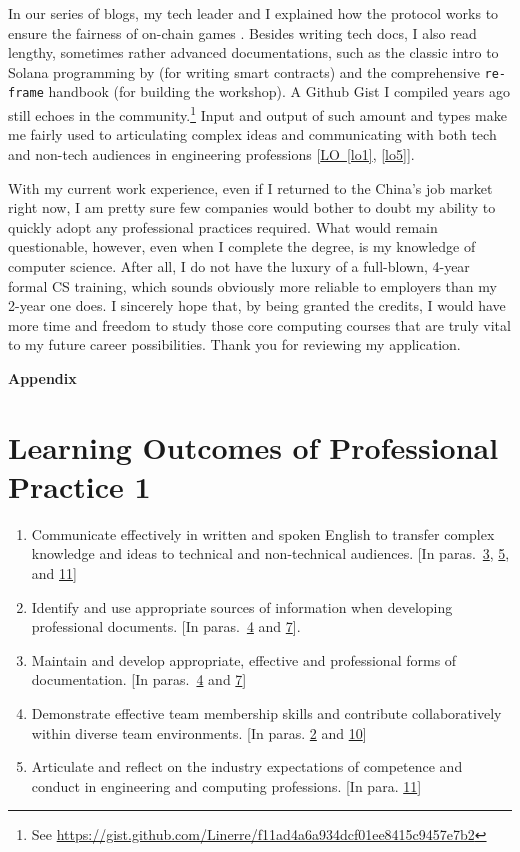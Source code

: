 \documentclass[12pt,a4paper]{article}
\renewcommand{\appendixpagename}{\centerline{{\Large\bfseries Appendix}}}
\newcommand{\refpp}[1]{\hyperref[#1]{LO~\ref{#1}}}
\newcommand{\refpa}[1]{\hyperlink{para#1}{#1}}
\begin{document}
\hypertarget{para11}{}
In our series of blogs, my tech leader and I explained how the protocol works to ensure the fairness of on-chain games \citep{race2022}.  Besides writing tech docs,  I also read lengthy, sometimes rather advanced documentations, such as the classic intro to Solana programming by \citet*{paulx2021} (for writing smart contracts) and the comprehensive \texttt{re-frame} handbook \citep{day8} (for building the workshop).  A Github Gist I compiled years ago still echoes in the community.\footnote{See \url{https://gist.github.com/Linerre/f11ad4a6a934dcf01ee8415c9457e7b2}}  Input and output of such amount and types make me fairly used to articulating complex ideas  and communicating with both tech and non-tech audiences in engineering professions [\refpp{lo1}, \ref{lo5}].

With my current work experience, even if I returned to the China's job market right now, I am pretty sure few companies would bother to doubt my ability to quickly adopt any professional practices required.  What would remain questionable, however, even when I complete the degree, is my knowledge of computer science.  After all, I do not have the luxury of a full-blown, 4-year formal CS training, which sounds obviously more reliable to employers than my 2-year one does.  I sincerely hope that, by being granted the credits, I would have more time and freedom to study those core computing courses that are truly vital to my future career possibilities.  Thank you for reviewing my application.




\clearpage
\appendixpagename
\setcounter{section}{0}%
\renewcommand{\thesection}{\Alph{section}}%
\section*{Learning Outcomes of Professional Practice 1}
\begin{enumerate}
\item\label{lo1} Communicate effectively in written and spoken English to transfer complex knowledge and ideas to technical and non-technical audiences. [In paras.~\refpa{3}, \refpa{5}, and \refpa{11}]
\item\label{lo2} Identify and use appropriate sources of information when developing professional documents.  [In paras.~\refpa{4} and \refpa{7}].
\item\label{lo3} Maintain and develop appropriate, effective and professional forms of documentation.  [In paras.~\refpa{4} and \refpa{7}]
\item\label{lo4} Demonstrate effective team membership skills and contribute collaboratively within diverse team environments.  [In paras. \refpa{2} and \refpa{10}]
\item\label{lo5} Articulate and reflect on the industry expectations of competence and conduct in engineering and computing professions.  [In para. \refpa{11}]
\end{enumerate}
\end{document}
